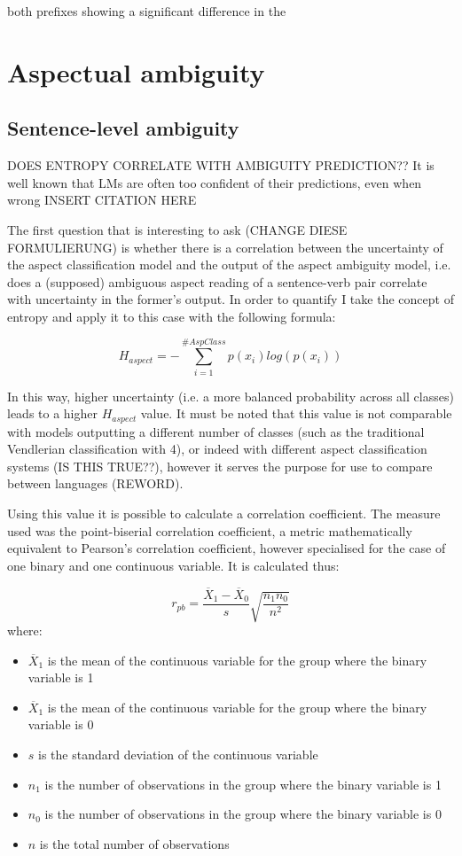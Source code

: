 both prefixes showing a significant difference in the 

\section{Aspectual ambiguity}
\subsection{Sentence-level ambiguity}
DOES ENTROPY CORRELATE WITH AMBIGUITY PREDICTION??
It is well known that LMs are often too confident of their predictions, even when wrong INSERT CITATION HERE

The first question that is interesting to ask (CHANGE DIESE FORMULIERUNG) is whether there is a correlation between the uncertainty of the aspect classification model and the output of the aspect ambiguity model, i.e. does a (supposed) ambiguous aspect reading of a sentence-verb pair correlate with uncertainty in the former's output. In order to quantify I take the concept of entropy and apply it to this case with the following formula:

$$H_{aspect} = - \sum_{i=1}^{\#AspClass}p(x_i)log(p(x_i))$$

In this way, higher uncertainty (i.e. a more balanced probability across all classes) leads to a higher $H_{aspect}$ value. It must be noted that this value is not comparable with models outputting a different number of classes (such as the traditional Vendlerian classification with 4), or indeed with different aspect classification systems (IS THIS TRUE??), however it serves the purpose for use to compare between languages (REWORD).

Using this value it is possible to calculate a correlation coefficient. The measure used was the point-biserial correlation coefficient, a metric mathematically equivalent to Pearson's correlation coefficient, however specialised for the case of one binary and one continuous variable. It is calculated thus:

$$r_{pb} = \frac{\overline{X}_1 - \overline{X}_0}{s} \sqrt{\frac{n_1 n_0}{n^2}}$$
where:
\begin{itemize}
    \item $\overline{X}_1$ is the mean of the continuous variable for the group where the binary variable is 1
    \item $\overline{X}_1$ is the mean of the continuous variable for the group where the binary variable is 0
    \item $s$ is the standard deviation of the continuous variable
    \item $n_1$ is the number of observations in the group where the binary variable is 1
    \item $n_0$ is the number of observations in the group where the binary variable is 0
    \item $n$ is the total number of observations
\end{itemize}

